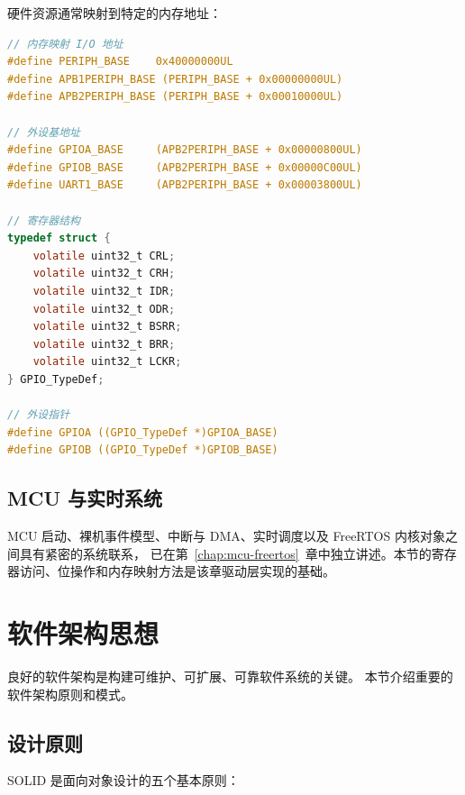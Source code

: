 
硬件资源通常映射到特定的内存地址：

\begin{lstlisting}[language=C]
// 内存映射 I/O 地址
#define PERIPH_BASE    0x40000000UL
#define APB1PERIPH_BASE (PERIPH_BASE + 0x00000000UL)
#define APB2PERIPH_BASE (PERIPH_BASE + 0x00010000UL)

// 外设基地址
#define GPIOA_BASE     (APB2PERIPH_BASE + 0x00000800UL)
#define GPIOB_BASE     (APB2PERIPH_BASE + 0x00000C00UL)
#define UART1_BASE     (APB2PERIPH_BASE + 0x00003800UL)

// 寄存器结构
typedef struct {
    volatile uint32_t CRL;
    volatile uint32_t CRH;
    volatile uint32_t IDR;
    volatile uint32_t ODR;
    volatile uint32_t BSRR;
    volatile uint32_t BRR;
    volatile uint32_t LCKR;
} GPIO_TypeDef;

// 外设指针
#define GPIOA ((GPIO_TypeDef *)GPIOA_BASE)
#define GPIOB ((GPIO_TypeDef *)GPIOB_BASE)
\end{lstlisting}

\subsection{MCU 与实时系统}

MCU 启动、裸机事件模型、中断与 DMA、实时调度以及 FreeRTOS 内核对象之间具有紧密的系统联系，
已在第~\ref{chap:mcu-freertos}~章中独立讲述。本节的寄存器访问、位操作和内存映射方法是该章驱动层实现的基础。

\section{软件架构思想}

良好的软件架构是构建可维护、可扩展、可靠软件系统的关键。
本节介绍重要的软件架构原则和模式。

\subsection{设计原则}


SOLID 是面向对象设计的五个基本原则：

